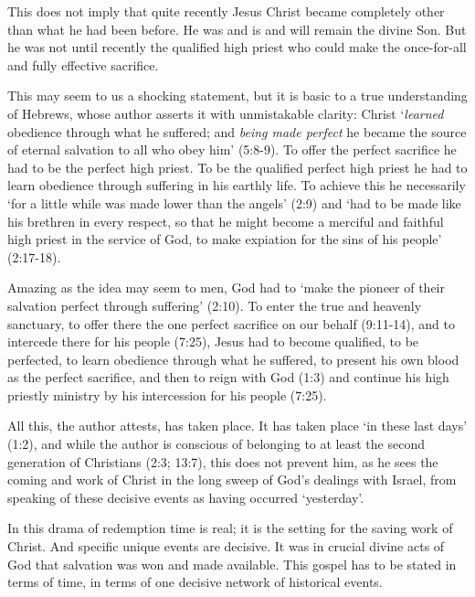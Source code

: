 This does not imply that quite recently Jesus Christ became completely other
than what he had been before.
He was and is and will remain the divine Son.
But he was not until recently the qualified high priest who could make the
once-for-all and fully effective sacrifice.
\newline

This may seem to us a shocking statement, but it is basic to a true
understanding of Hebrews, whose author asserts it with unmistakable clarity:
Christ `{\it learned} obedience through what he suffered; and {\it being made
perfect} he became the source of eternal salvation to all who obey him' (5:8-9).
To offer the perfect sacrifice he had to be the perfect high priest.
To be the qualified perfect high priest he had to learn obedience through
suffering in his earthly life.
To achieve this he necessarily `for a little while was made lower than the
angels' (2:9) and `had to be made like his brethren in every respect, so that he
might become a merciful and faithful high priest in the service of God, to make
expiation for the sins of his people' (2:17-18).
\newline

Amazing as the idea may seem to men, God had to `make the pioneer of their
salvation perfect through suffering' (2:10).
To enter the true and heavenly sanctuary, to offer there the one perfect
sacrifice on our behalf (9:11-14), and to intercede there for his people (7:25),
Jesus had to become qualified, to be perfected, to learn obedience through what
he suffered, to present his own blood as the perfect sacrifice, and then to
reign with God (1:3) and continue his high priestly ministry by his intercession
for his people (7:25).
\newline

All this, the author attests, has taken place.
It has taken place `in these last days' (1:2), and while the author is conscious
of belonging to at least the second generation of Christians (2:3; 13:7), this
does not prevent him, as he sees the coming and work of Christ in the long sweep
of God's dealings with Israel, from speaking of these decisive events as having
occurred `yesterday'.
\newline

In this drama of redemption time is real; it is the setting for the saving work
of Christ.
And specific unique events are decisive.
It was in crucial divine acts of God that salvation was won and made available.
This gospel has to be stated in terms of time, in terms of one decisive network
of historical events.
\newline

